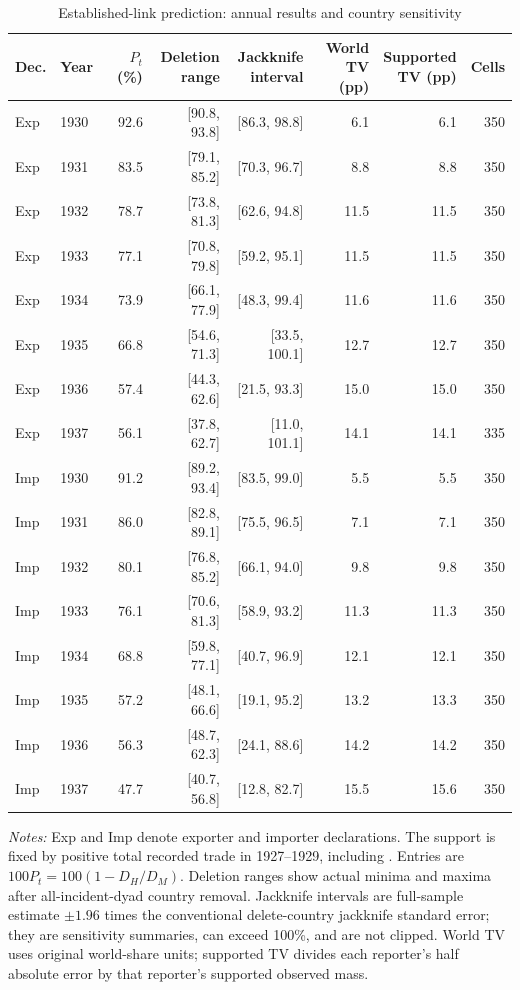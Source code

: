 \begin{table}[!htbp]\centering
\caption{Established-link prediction: annual results and country sensitivity}\label{tab:app_primary}
\begin{threeparttable}\footnotesize\setlength{\tabcolsep}{4pt}
\begin{tabular}{@{}llrrrrrr@{}}
\toprule
Dec. & Year & $P_t$ (\%) & \shortstack{Deletion\\range} & \shortstack{Jackknife\\interval} & \shortstack{World\\TV (pp)} & \shortstack{Supported\\TV (pp)} & Cells \\
\midrule
Exp & 1930 & 92.6 & [90.8, 93.8] & [86.3, 98.8] & 6.1 & 6.1 & 350 \\
Exp & 1931 & 83.5 & [79.1, 85.2] & [70.3, 96.7] & 8.8 & 8.8 & 350 \\
Exp & 1932 & 78.7 & [73.8, 81.3] & [62.6, 94.8] & 11.5 & 11.5 & 350 \\
Exp & 1933 & 77.1 & [70.8, 79.8] & [59.2, 95.1] & 11.5 & 11.5 & 350 \\
Exp & 1934 & 73.9 & [66.1, 77.9] & [48.3, 99.4] & 11.6 & 11.6 & 350 \\
Exp & 1935 & 66.8 & [54.6, 71.3] & [33.5, 100.1] & 12.7 & 12.7 & 350 \\
Exp & 1936 & 57.4 & [44.3, 62.6] & [21.5, 93.3] & 15.0 & 15.0 & 350 \\
Exp & 1937 & 56.1 & [37.8, 62.7] & [11.0, 101.1] & 14.1 & 14.1 & 335 \\
Imp & 1930 & 91.2 & [89.2, 93.4] & [83.5, 99.0] & 5.5 & 5.5 & 350 \\
Imp & 1931 & 86.0 & [82.8, 89.1] & [75.5, 96.5] & 7.1 & 7.1 & 350 \\
Imp & 1932 & 80.1 & [76.8, 85.2] & [66.1, 94.0] & 9.8 & 9.8 & 350 \\
Imp & 1933 & 76.1 & [70.6, 81.3] & [58.9, 93.2] & 11.3 & 11.3 & 350 \\
Imp & 1934 & 68.8 & [59.8, 77.1] & [40.7, 96.9] & 12.1 & 12.1 & 350 \\
Imp & 1935 & 57.2 & [48.1, 66.6] & [19.1, 95.2] & 13.2 & 13.3 & 350 \\
Imp & 1936 & 56.3 & [48.7, 62.3] & [24.1, 88.6] & 14.2 & 14.2 & 350 \\
Imp & 1937 & 47.7 & [40.7, 56.8] & [12.8, 82.7] & 15.5 & 15.6 & 350 \\
\bottomrule
\end{tabular}
\begin{tablenotes}[flushleft]\footnotesize\item \textit{Notes:} Exp and Imp denote exporter and importer declarations. The support is fixed by positive total recorded trade in 1927--1929, including \External{}. Entries are $100P_t=100(1-D_H/D_M)$. Deletion ranges show actual minima and maxima after all-incident-dyad country removal. Jackknife intervals are full-sample estimate $\pm1.96$ times the conventional delete-country jackknife standard error; they are sensitivity summaries, can exceed 100\%, and are not clipped. World TV uses original world-share units; supported TV divides each reporter's half absolute error by that reporter's supported observed mass.

\end{tablenotes}
\end{threeparttable}
\end{table}
